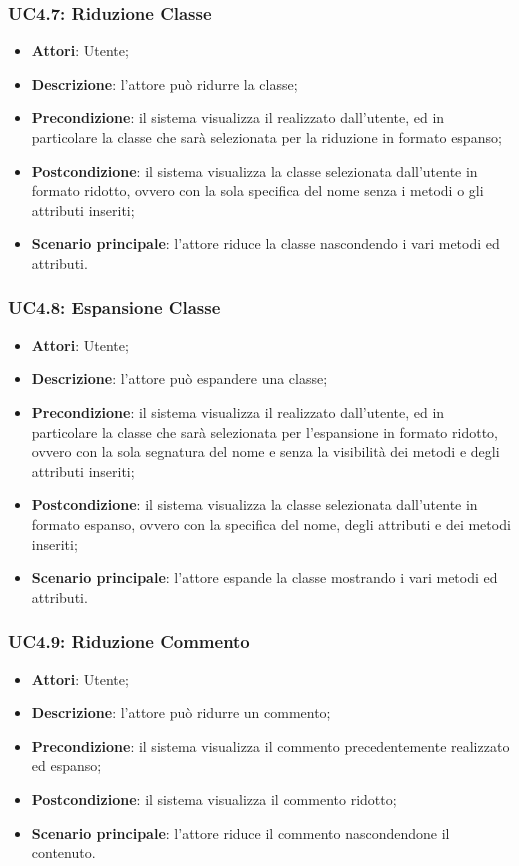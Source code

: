 \subsubsection{UC4.7: Riduzione Classe}
\label{UC4.7}
\begin{itemize}
	\item \textbf{Attori}: Utente;
	\item \textbf{Descrizione}: l'attore può ridurre la classe;
	\item \textbf{Precondizione}: il sistema visualizza il  realizzato dall'utente, ed in particolare la classe che sarà selezionata per la riduzione in formato espanso;
	\item \textbf{Postcondizione}: il sistema visualizza la classe selezionata dall'utente in formato ridotto, ovvero con la sola specifica del nome senza i metodi o gli attributi inseriti;
	\item \textbf{Scenario principale}: l'attore riduce la classe nascondendo i vari metodi ed attributi.
\end{itemize}

\subsubsection{UC4.8: Espansione Classe}
\label{UC4.8}
\begin{itemize}
	\item \textbf{Attori}: Utente;
	\item \textbf{Descrizione}: l'attore può espandere una classe;
	\item \textbf{Precondizione}: il sistema visualizza il  realizzato dall'utente, ed in particolare la classe che sarà selezionata per l'espansione in formato ridotto, ovvero con la sola segnatura del nome e senza la visibilità dei metodi e degli attributi inseriti;
	\item \textbf{Postcondizione}: il sistema visualizza la classe selezionata dall'utente in formato espanso, ovvero con la specifica del nome, degli attributi e dei metodi inseriti;
	\item \textbf{Scenario principale}: l'attore espande la classe mostrando i vari metodi ed attributi.
\end{itemize}

\subsubsection{UC4.9: Riduzione Commento}
\label{UC4.9}
\begin{itemize}
	\item \textbf{Attori}: Utente;
	\item \textbf{Descrizione}: l'attore può ridurre un commento;
	\item \textbf{Precondizione}: il sistema visualizza il commento precedentemente realizzato ed espanso;
	\item \textbf{Postcondizione}: il sistema visualizza il commento ridotto;
	\item \textbf{Scenario principale}: l'attore riduce il commento nascondendone il contenuto.
\end{itemize}

